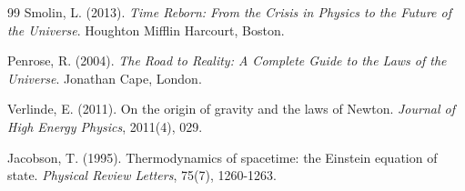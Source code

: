 \documentclass[12pt,a4paper]{article}
\theoremstyle{remark}
\begin{document}
\begin{thebibliography}{99}
Smolin, L. (2013). \textit{Time Reborn: From the Crisis in Physics to the Future of the Universe}. Houghton Mifflin Harcourt, Boston.

Penrose, R. (2004). \textit{The Road to Reality: A Complete Guide to the Laws of the Universe}. Jonathan Cape, London.

Verlinde, E. (2011). On the origin of gravity and the laws of Newton. \textit{Journal of High Energy Physics}, 2011(4), 029.

Jacobson, T. (1995). Thermodynamics of spacetime: the Einstein equation of state. \textit{Physical Review Letters}, 75(7), 1260-1263.

\end{thebibliography}
\end{document}
